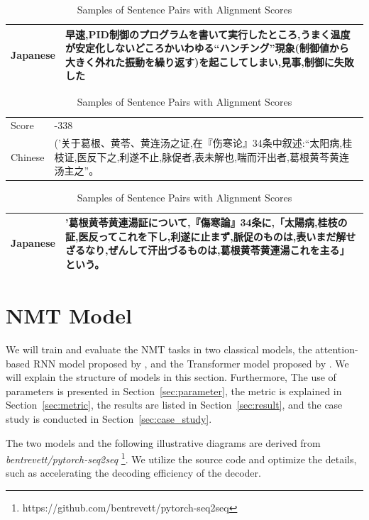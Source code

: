 \begin{table}[h]
\begin{CJK}{UTF8}{long}
        \begin{tabularx}{\textwidth}{lb}
            Japanese & 早速,PID制御のプログラムを書いて実行したところ,うまく温度が安定化しないどころかいわゆる“ハンチング”現象(制御値から大きく外れた振動を繰り返す)を起こしてしまい,見事,制御に失敗した \\
            \midrule
        \end{tabularx}
    \end{CJK}
    \begin{CJK}{UTF8}{gbsn}
        \begin{tabularx}{\textwidth}{lb}
            Score & -338 \\
            {Chinese } & ('关于葛根、黄苓、黄连汤之证,在『伤寒论』34条中叙述:“太阳病,桂枝证,医反下之,利遂不止,脉促者,表未解也,喘而汗出者,葛根黄芩黄连汤主之”。 \\
        \end{tabularx}
    \end{CJK}
    \begin{CJK}{UTF8}{long}
        \begin{tabularx}{\textwidth}{lb}
            Japanese & '葛根黄苓黄連湯証について,『傷寒論』34条に,「太陽病,桂枝の証,医反ってこれを下し,利遂に止まず,脈促のものは,表いまだ解せざるなり,ぜんして汗出づるものは,葛根黄苓黄連湯これを主る」という。 \\
            \midrule
        \end{tabularx}
    \end{CJK}
    \caption{Samples of Sentence Pairs with Alignment Scores}
    \label{tab:alignment_samples}
\end{table}

\section{NMT Model} \label{sec:nmt_model}

We will train and evaluate the NMT tasks in two classical models, the attention-based RNN model proposed by \cite{bahdanau2014neural}, and the Transformer model proposed by \cite{NIPS2017_3f5ee243}. We will explain the structure of models in this section. Furthermore, The use of parameters is presented in Section~\ref{sec:parameter}, the metric is explained in Section~\ref{sec:metric}, the results are listed in Section~\ref{sec:result}, and the case study is conducted in Section~\ref{sec:case_study}.

The two models and the following illustrative diagrams are derived from \textit{bentrevett/pytorch-seq2seq} \footnote{https://github.com/bentrevett/pytorch-seq2seq}. We utilize the source code and optimize the details, such as accelerating the decoding efficiency of the decoder.

